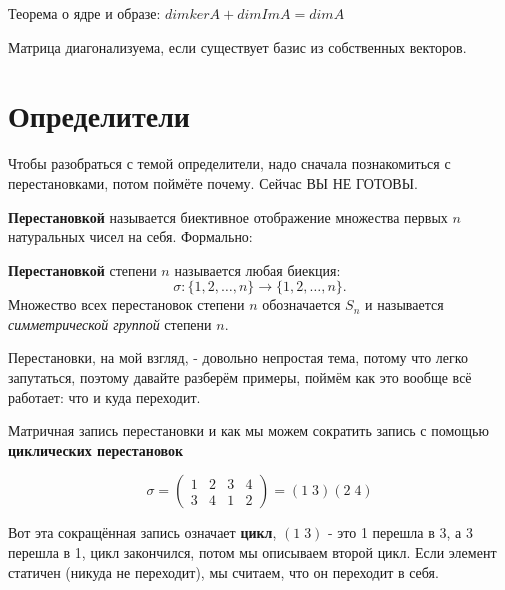 \documentclass[12pt]{article}
\begin{document}
\begin{theorembox}
    Теорема о ядре и образе: $dimkerA + dimImA = dimA$
\end{theorembox}

\begin{remarkbox}
    Матрица диагонализуема, если существует базис из собственных векторов.
\end{remarkbox}

\section{Определители}

Чтобы разобраться с темой определители, надо сначала познакомиться с перестановками, потом поймёте почему. Сейчас ВЫ НЕ ГОТОВЫ.\\

\begin{definitionbox}
    \textbf{Перестановкой} называется биективное отображение множества первых \( n \) натуральных чисел на себя. Формально:


    \textbf{Перестановкой} степени \( n \) называется любая биекция:
    \[
    \sigma \colon \{1, 2, \dots, n\} \to \{1, 2, \dots, n\}.
    \]
    Множество всех перестановок степени \( n \) обозначается \( S_n \) и называется \textit{симметрической группой} степени \( n \).
\end{definitionbox}

Перестановки, на мой взгляд, - довольно непростая тема, потому что легко запутаться, поэтому давайте разберём примеры, поймём как это вообще всё работает: что и куда переходит.\\

\begin{examplebox}
    Матричная запись перестановки и как мы можем сократить запись с помощью \textbf{циклических перестановок}

    \[
        \sigma = \begin{pmatrix}
        1 & 2 & 3 & 4 \\
        3 & 4 & 1 & 2
        \end{pmatrix}
         = (1\;3)(2\;4)
    \]

    Вот эта сокращённая запись означает \textbf{цикл}, $(1\;3)$ - это 1 перешла в 3, а 3 перешла в 1, цикл закончился, потом мы описываем второй цикл. Если элемент статичен (никуда не переходит), мы считаем, что он переходит в себя.
\end{examplebox}
\end{document}
